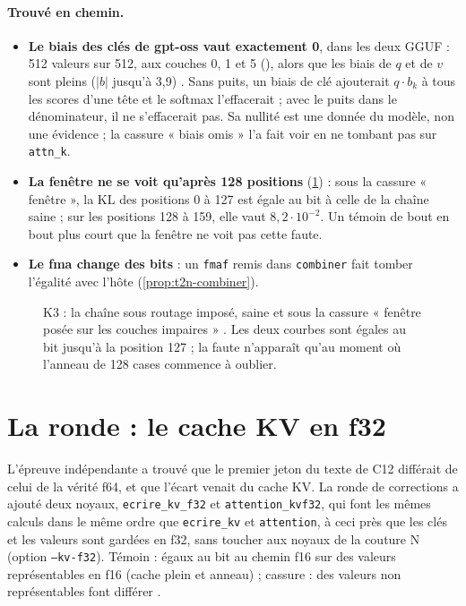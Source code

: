 \paragraph{Trouvé en chemin.}
\begin{itemize}
\item \textbf{Le biais des clés de gpt-oss vaut exactement 0}, dans les deux GGUF : 512 valeurs sur 512, aux couches 0, 1 et 5 (), alors que les biais de $q$ et de $v$ sont pleins ($|b|$ jusqu'à 3,9) \mes. Sans puits, un biais de clé ajouterait $q \cdot b_k$ à tous les scores d'une tête et le softmax l'effacerait ; avec le puits dans le dénominateur, il ne s'effacerait pas. Sa nullité est une donnée du modèle, non une évidence ; la cassure « biais omis » l'a fait voir en ne tombant pas sur \texttt{attn\_k}.
\item \textbf{La fenêtre ne se voit qu'après 128 positions} (\cref{fig:t2n-fenetre-kl}) : sous la cassure « fenêtre », la KL des positions 0 à 127 est égale au bit à celle de la chaîne saine ; sur les positions 128 à 159, elle vaut $8{,}2\cdot10^{-2}$. Un témoin de bout en bout plus court que la fenêtre ne voit pas cette faute.
\item \textbf{Le fma change des bits} : un \texttt{fmaf} remis dans \texttt{combiner} fait tomber l'égalité avec l'hôte (\cref{prop:t2n-combiner}).
\end{itemize}

\begin{figure}[!htbp]
\centering
\GrapheNoyFenetre
\caption[K3 : la cassure « fenêtre » et sa marche à 128]{K3 : la chaîne sous routage imposé, saine et sous la cassure « fenêtre posée sur les couches impaires » \mes. Les deux courbes sont égales au bit jusqu'à la position 127 ; la faute n'apparaît qu'au moment où l'anneau de 128 cases commence à oublier.}
\label{fig:t2n-fenetre-kl}
\end{figure}

\section{La ronde : le cache KV en f32}\label{sec:t2n-kv}

L'épreuve indépendante a trouvé que le premier jeton du texte de C12 différait de celui de la vérité f64, et que l'écart venait du cache KV. La ronde de corrections a ajouté deux noyaux, \texttt{ecrire\_kv\_f32} et \texttt{attention\_kvf32}, qui font les mêmes calculs dans le même ordre que \texttt{ecrire\_kv} et \texttt{attention}, à ceci près que les clés et les valeurs sont gardées en f32, sans toucher aux noyaux de la couture N (option \texttt{--kv-f32}). Témoin : égaux au bit au chemin f16 sur des valeurs représentables en f16 (cache plein et anneau) ; cassure : des valeurs non représentables font différer \mes.

